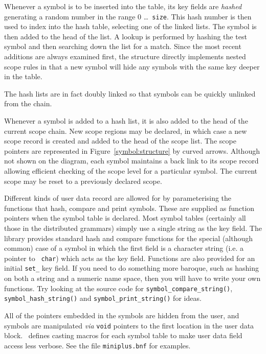 Whenever a symbol is to be inserted into the table, its key fields are
{\em hashed} generating a random number in the range 0 \ldots {\tt
size}. This hash number is then used to index into the hash table,
selecting one of the linked lists. The symbol is then added to the head
of the list. A lookup is performed by hashing the test symbol and then
searching down the list for a match. Since the most recent additions are
always examined first, the structure directly implements nested scope
rules in that a new symbol will hide any symbols with the same key
deeper in the table.

The hash lists are in fact doubly linked so that symbols can be quickly
unlinked from the chain.

Whenever a symbol is added to a hash list, it is also added to the head
of the current scope chain. New scope regions may be declared, in which case a
new scope record is created and added to the head of the scope list. The
scope pointers are represented in Figure~\ref{symbol:structure} by
curved arrows. Although not shown on the diagram, each symbol maintains
a back link to its scope record allowing efficient checking of the
scope level for a particular symbol. The current scope may be reset to
a previously declared scope.

Different kinds of user data record are allowed for by parameterising
the functions that hash, compare and print symbols. These are supplied
as function pointers when the symbol table is declared. Most symbol
tables (certainly all those in the distributed grammars) simply use a
single string as the key field.  The library provides standard hash and
compare functions for the special (although common) case of a symbol in
which the first field is a character string (i.e. a pointer to {\tt
char}) which acts as the key field. Functions are also provided for an
initial \verb+set_+ key field. If you need to do something more baroque,
such as hashing on both a string and a numeric name space, then you will
have to write your own functions. Try looking at the source code for
\verb+symbol_compare_string()+, \verb+symbol_hash_string()+ and
\verb+symbol_print_string()+ for ideas.


All of the pointers embedded in the symbols are hidden from the user,
and symbols are manipulated {\em via} {\tt void} pointers to the first
location in the user data block. \rdp\ defines casting macros for each
symbol table to make user data field access less verbose. See the file
\verb+miniplus.bnf+ for examples.

